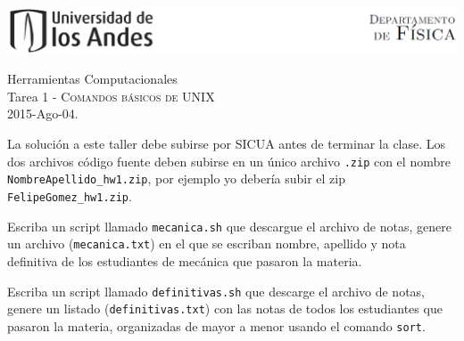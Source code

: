 \documentclass[11pt,letterpaper]{exam}
\begin{document}
\begin{center}

\includegraphics[width=16cm]{header.png}

{\Large Herramientas Computacionales} \\
Tarea 1 - \textsc{Comandos b\'asicos de UNIX}\\
2015-Ago-04.\\
\end{center}



\vspace{0.5cm}

\noindent
La solución a este taller debe subirse por SICUA antes de terminar la clase.
\noindent
Los dos archivos c\'odigo fuente deben subirse en un \'unico archivo
\verb".zip" con el nombre \verb"NombreApellido_hw1.zip", por ejemplo
yo deber\'ia subir el zip \verb"FelipeGomez_hw1.zip".

\vspace{0.5cm}

\begin{questions}
 

Escriba un script llamado \verb"mecanica.sh" que descargue el archivo de notas,
genere un archivo 
(\verb"mecanica.txt") en el que se escriban nombre, apellido y nota definitiva
de los estudiantes de mecánica que pasaron la materia.



Escriba un script llamado \verb"definitivas.sh" que descarge el archivo de notas, genere un listado 
(\verb"definitivas.txt") con las notas de todos los estudiantes que pasaron 
la materia, organizadas de mayor a menor usando el comando \verb"sort".



\end{questions}
\end{document}
